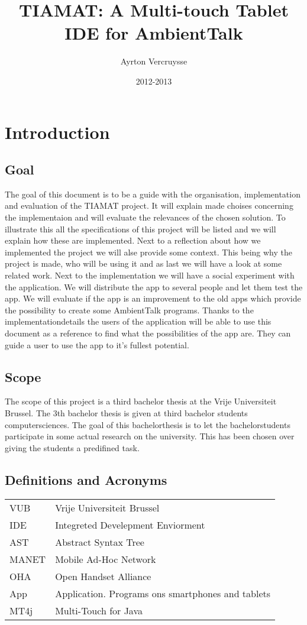 \documentclass[a4paper,12pt]{report}
\author{Ayrton Vercruysse}
\title{TIAMAT: A Multi-touch Tablet IDE for AmbientTalk}
\date{2012-2013}
\begin{document}
\maketitlepage
\tableofcontents
\chapter{Introduction}
\section{Goal}
The goal of this document is to be a guide with the organisation, implementation and evaluation of the TIAMAT project. It will explain made choises concerning the implementaion and will evaluate
the relevances of the chosen solution. To illustrate this all the specifications of this project will be listed and we will explain how these are implemented.
Next to a reflection about how we implemented the project we will alse provide some context. This being why the project is made, who will be using it and as last we will have a look at some 
related work.
Next to the implementation we will have a social experiment with the application. We will distribute the app to several people and let them test the app. We will evaluate if the app is an 
improvement to the old apps which provide the possibility to create some AmbientTalk programs. 
Thanks to the implementationdetails the users of the application will be able to use this document as a reference to find what the possibilities of the app are. They can guide a user to use the
app to it's fullest potential.

\section{Scope}
The scope of this project is a third bachelor thesis at the Vrije Universiteit Brussel. The 3th bachelor thesis is given at third bachelor students computersciences. The goal of this bachelorthesis
is to let the bachelorstudents  participate in some actual research on the university. This has been chosen over giving the students a predifined task.
\section{Definitions and Acronyms}

\begin{tabular}{ l l }
  VUB & Vrije Universiteit Brussel \\
  IDE & Integreted Develepment Enviorment \\
  AST & Abstract Syntax Tree \\
  MANET 	& Mobile Ad-Hoc Network \\
  OHA & Open Handset Alliance \\
  App & Application. Programs ons smartphones and tablets \\
  MT4j & Multi-Touch for Java \\
\end{tabular}
\end{document}
